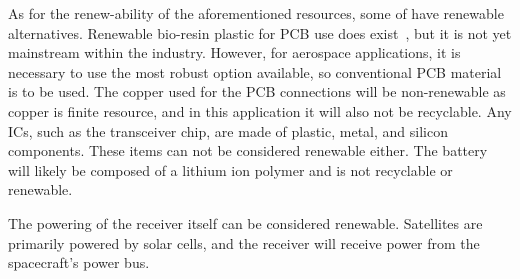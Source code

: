 \documentclass[12pt, twoside]{report}
\begin{document}
\par As for the renew-ability of the aforementioned resources, some of have renewable alternatives.
Renewable bio-resin plastic for PCB use does exist~\cite{biopcb}, but it is not yet mainstream within the industry.
However, for aerospace applications, it is necessary to use the most robust option available, so conventional PCB material is to be used.
The copper used for the PCB connections will be non-renewable as copper is finite resource, and in this application it will also not be recyclable.
Any ICs, such as the transceiver chip, are made of plastic, metal, and silicon components.
These items can not be considered renewable either.
The battery will likely be composed of a lithium ion polymer and is not recyclable or renewable.

\par The powering of the receiver itself can be considered renewable. Satellites are primarily powered by solar cells, and the receiver will receive power from the spacecraft's power bus.
\end{document}
